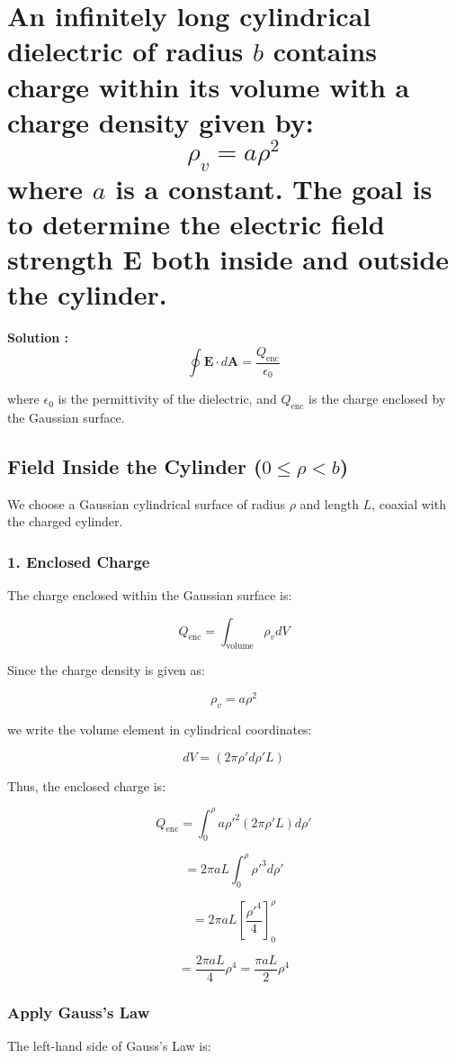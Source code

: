 \documentclass[a4paper,12pt]{article}
\begin{document}
\section{An infinitely long cylindrical dielectric of radius \( b \) contains charge within its volume with a charge density given by:\[\rho_v = a \rho^2\]where \( a \) is a constant. The goal is to determine the electric field strength \( \mathbf{E} \) both inside and outside the cylinder.}
\textbf{Solution :}
\[
\oint \mathbf{E} \cdot d\mathbf{A} = \frac{Q_{\text{enc}}}{\epsilon_{0}}
\]

where \( \epsilon_{0} \) is the permittivity of the dielectric, and \( Q_{\text{enc}} \) is the charge enclosed by the Gaussian surface.

\subsection{Field Inside the Cylinder (\( 0 \leq \rho < b \))}

We choose a Gaussian cylindrical surface of radius \( \rho \) and length \( L \), coaxial with the charged cylinder.

\subsubsection{1. Enclosed Charge}
The charge enclosed within the Gaussian surface is:

\[
Q_{\text{enc}} = \int_{\text{volume}} \rho_v dV
\]

Since the charge density is given as:

\[
\rho_v = a \rho^2
\]

we write the volume element in cylindrical coordinates:

\[
dV = (2\pi \rho' d\rho' L)
\]

Thus, the enclosed charge is:

\[
Q_{\text{enc}} = \int_0^{\rho} a\rho'^2 (2\pi \rho' L) d\rho'
\]

\[
= 2\pi a L \int_0^{\rho} \rho'^3 d\rho'
\]

\[
= 2\pi a L \left[ \frac{\rho'^4}{4} \right]_0^{\rho}
\]

\[
= \frac{2\pi a L}{4} \rho^4 = \frac{\pi a L}{2} \rho^4
\]

\subsubsection{Apply Gauss’s Law}
The left-hand side of Gauss’s Law is:
\end{document}
